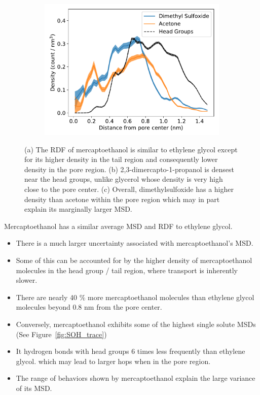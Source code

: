 \documentclass{article}
\begin{document}
\begin{figure}
\begin{subfigure}{0.325\linewidth}
  \includegraphics[width=\textwidth]{thiol_comparison_DMS.pdf}
  \caption{}\label{fig:DMP_GLY_comparison}
  \end{subfigure}
  \caption{(a) The RDF of mercaptoethanol is similar to ethylene glycol except 
  for its higher density in the tail region and consequently lower density in the
  pore region. (b) 2,3-dimercapto-1-propanol is densest near the head groups, 
  unlike glycerol whose density is very high close to the pore center. 
  (c) Overall, dimethylsulfoxide has a higher density than acetone within the 
  pore region which may in part explain its marginally larger MSD.}\label{fig:sulfur_analog_rdfs}
  \end{figure}
  
  \noindent Mercaptoethanol has a similar average MSD and RDF to ethylene glycol.
  \begin{itemize}
    \item There is a much larger uncertainty associated with mercaptoethanol's MSD.
    \item Some of this can be accounted for by the higher density of mercaptoethanol 
    molecules in the head group / tail region, where transport is inherently slower. 
    \item There are nearly 40 \% more mercaptoethanol molecules than ethylene 
    glycol molecules beyond 0.8 nm from the pore center. 
    \item Conversely, mercaptoethanol exhibits some of the highest single solute MSDs 
    (See Figure~\ref{fig:SOH_trace})  %
    \item It hydrogen bonds with head groups 6 times less frequently than ethylene glycol.
    which may lead to larger hops when in the pore region.
    \item The range of behaviors shown by mercaptoethanol explain the large variance
    of its MSD.
  \end{itemize}
  
\end{document}
